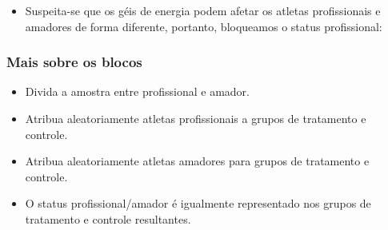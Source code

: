 \begin{frame}
{\begin{itemize}
\pause

\begin{itemize}
\item Tratamento: usar energy gel
\item Controle: não usar energy gel
\end{itemize}

\pause
\justifying
\item Suspeita-se que os géis de energia podem afetar os atletas profissionais e amadores de forma diferente, portanto, bloqueamos o status profissional:

\pause
\end{itemize}}
\end{frame}

\begin{frame}
\frametitle{Mais sobre os blocos}

\begin{itemize}
   \begin{itemize}
   \justifying
\item Divida a amostra entre profissional e amador.
\justifying
\item Atribua aleatoriamente atletas profissionais a grupos de tratamento e controle.
\justifying
\item Atribua aleatoriamente atletas amadores para grupos de tratamento e controle.
\justifying
\item O status profissional/amador é igualmente representado nos grupos de tratamento e controle resultantes.
\end{itemize}
\end{itemize}


\pause


\end{frame}


